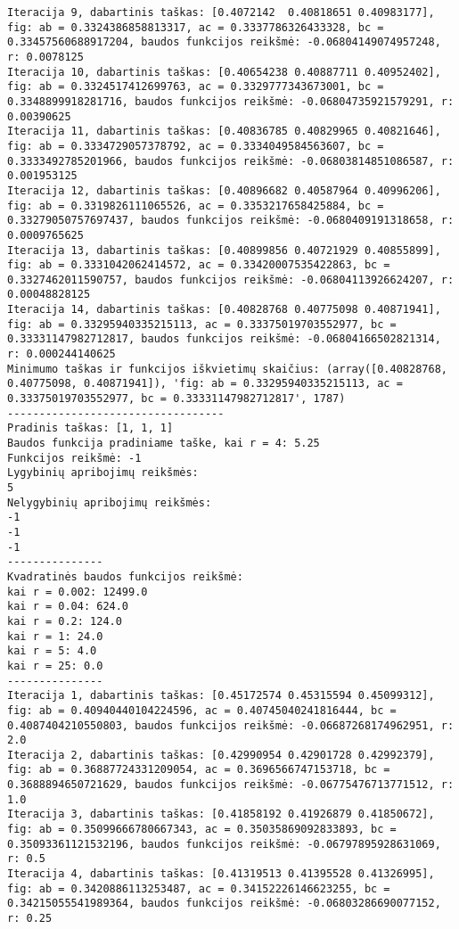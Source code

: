 \documentclass[a4paper,12pt,fleqn]{article}
\begin{document}
\begin{verbatim}
Iteracija 9, dabartinis taškas: [0.4072142  0.40818651 0.40983177], fig: ab = 0.3324386858813317, ac = 0.3337786326433328, bc = 0.33457560688917204, baudos funkcijos reikšmė: -0.06804149074957248, r: 0.0078125
Iteracija 10, dabartinis taškas: [0.40654238 0.40887711 0.40952402], fig: ab = 0.3324517412699763, ac = 0.3329777343673001, bc = 0.3348899918281716, baudos funkcijos reikšmė: -0.06804735921579291, r: 0.00390625
Iteracija 11, dabartinis taškas: [0.40836785 0.40829965 0.40821646], fig: ab = 0.3334729057378792, ac = 0.3334049584563607, bc = 0.3333492785201966, baudos funkcijos reikšmė: -0.06803814851086587, r: 0.001953125
Iteracija 12, dabartinis taškas: [0.40896682 0.40587964 0.40996206], fig: ab = 0.3319826111065526, ac = 0.3353217658425884, bc = 0.33279050757697437, baudos funkcijos reikšmė: -0.0680409191318658, r: 0.0009765625
Iteracija 13, dabartinis taškas: [0.40899856 0.40721929 0.40855899], fig: ab = 0.3331042062414572, ac = 0.33420007535422863, bc = 0.3327462011590757, baudos funkcijos reikšmė: -0.06804113926624207, r: 0.00048828125
Iteracija 14, dabartinis taškas: [0.40828768 0.40775098 0.40871941], fig: ab = 0.33295940335215113, ac = 0.33375019703552977, bc = 0.33331147982712817, baudos funkcijos reikšmė: -0.06804166502821314, r: 0.000244140625
Minimumo taškas ir funkcijos iškvietimų skaičius: (array([0.40828768, 0.40775098, 0.40871941]), 'fig: ab = 0.33295940335215113, ac = 0.33375019703552977, bc = 0.33331147982712817', 1787)
----------------------------------
Pradinis taškas: [1, 1, 1]
Baudos funkcija pradiniame taške, kai r = 4: 5.25
Funkcijos reikšmė: -1
Lygybinių apribojimų reikšmės:
5
Nelygybinių apribojimų reikšmės:
-1
-1
-1
---------------
Kvadratinės baudos funkcijos reikšmė: 
kai r = 0.002: 12499.0
kai r = 0.04: 624.0
kai r = 0.2: 124.0
kai r = 1: 24.0
kai r = 5: 4.0
kai r = 25: 0.0
---------------
Iteracija 1, dabartinis taškas: [0.45172574 0.45315594 0.45099312], fig: ab = 0.40940440104224596, ac = 0.40745040241816444, bc = 0.4087404210550803, baudos funkcijos reikšmė: -0.06687268174962951, r: 2.0
Iteracija 2, dabartinis taškas: [0.42990954 0.42901728 0.42992379], fig: ab = 0.36887724331209054, ac = 0.3696566747153718, bc = 0.3688894650721629, baudos funkcijos reikšmė: -0.06775476713771512, r: 1.0
Iteracija 3, dabartinis taškas: [0.41858192 0.41926879 0.41850672], fig: ab = 0.35099666780667343, ac = 0.35035869092833893, bc = 0.35093361121532196, baudos funkcijos reikšmė: -0.06797895928631069, r: 0.5
Iteracija 4, dabartinis taškas: [0.41319513 0.41395528 0.41326995], fig: ab = 0.3420886113253487, ac = 0.34152226146623255, bc = 0.34215055541989364, baudos funkcijos reikšmė: -0.06803286690077152, r: 0.25

\end{verbatim}
\end{document}
